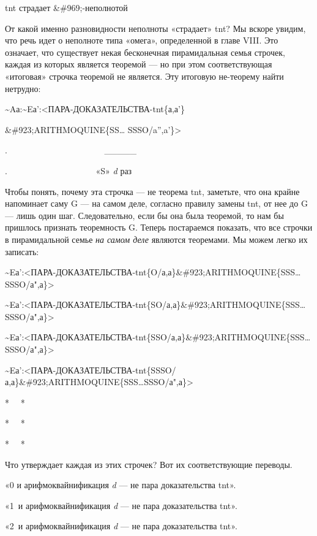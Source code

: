 \documentclass[../main.tex]{subfiles}
\begin{document}
\acs{tnt} страдает \&\#969;-неполнотой

От какой именно разновидности неполноты «страдает» \acs{tnt}? Мы вскоре увидим, что речь идет о неполноте типа «омега», определенной в главе VIII. Это означает, что существует некая бесконечная пирамидальная семья строчек, каждая из которых является теоремой --- но при этом соответствующая «итоговая» строчка теоремой не является. Эту итоговую не-теорему найти нетрудно:

\textasciitilde Aа:\textasciitilde Eа':\textless ПАРА-ДОКАЗАТЕЛЬСТВА-\acs{tnt}\{а,а'\}

\&\#923;ARITHMOQUINE\{SS\ldots{} SSSO/a'',a'\}\textgreater{}

.~~~~~~~~~~~~~~~~~~~~~~ \textbar\_\_\_\_\_\textbar{}

.~~~~~~~~~~~~~~~~~~~~ «S» \emph{d} раз

Чтобы понять, почему эта строчка --- не теорема \acs{tnt}, заметьте, что она крайне напоминает саму G --- на самом деле, согласно правилу замены \acs{tnt}, от нее до G --- лишь один шаг. Следовательно, если бы она была теоремой, то нам бы пришлось признать теоремность G. Теперь постараемся показать, что все строчки в пирамидальной семье \emph{на самом деле} являются теоремами. Мы можем легко их записать:

\textasciitilde Eа':\textless ПАРА-ДОКАЗАТЕЛЬСТВА-\acs{tnt}\{O/а,а\}\&\#923;ARITHMOQUINE\{SSS\ldots SSSO/а",а\}\textgreater{}

\textasciitilde Eа':\textless ПАРА-ДОКАЗАТЕЛЬСТВА-\acs{tnt}\{SO/а,а\}\&\#923;ARITHMOQUINE\{SSS\ldots SSSO/а",а\}\textgreater{}

\textasciitilde Eа':\textless ПАРА-ДОКАЗАТЕЛЬСТВА-\acs{tnt}\{SSO/а,а\}\&\#923;ARITHMOQUINE\{SSS\ldots SSSO/а",а\}\textgreater{}

\textasciitilde Eа':\textless ПАРА-ДОКАЗАТЕЛЬСТВА-\acs{tnt}\{SSSO/а,а\}\&\#923;ARITHMOQUINE\{SSS\ldots SSSO/а",а\}\textgreater{}

*~~ *

*~~ *

*~~ *

Что утверждает каждая из этих строчек? Вот их соответствующие переводы.

«0 и арифмоквайнификация \emph{d} --- не пара доказательства \acs{tnt}».

«1~и арифмоквайнификация \emph{d} --- не пара доказательства \acs{tnt}».

«2~и арифмоквайнификация \emph{d} --- не пара доказательства \acs{tnt}».
\end{document}
